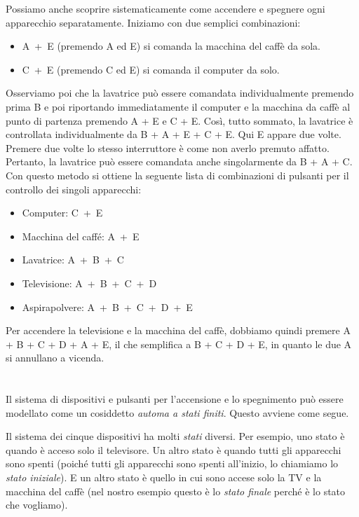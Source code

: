{{Possiamo anche scoprire sistematicamente come accendere e spegnere ogni apparecchio separatamente. Iniziamo con due semplici combinazioni:

\begin{itemize}
  \item A~+~E (premendo A ed E) si comanda la macchina del caffè da sola.
  \item C~+~E (premendo C ed E) si comanda il computer da solo.
\end{itemize}

Osserviamo poi che la lavatrice può essere comandata individualmente premendo prima B e poi riportando immediatamente il computer e la macchina da caffè al punto di partenza premendo A + E e C + E. Così, tutto sommato, la lavatrice è controllata individualmente da B + A + E + C + E. Qui E appare due volte. Premere due volte lo stesso interruttore è come non averlo premuto affatto. Pertanto, la lavatrice può essere comandata anche singolarmente da B + A + C. Con questo metodo si ottiene la seguente lista di combinazioni di pulsanti per il controllo dei singoli apparecchi:

\begin{itemize}
  \item Computer: C~+~E
  \item Macchina del caffé: A~+~E
  \item Lavatrice: A~+~B~+~C
  \item Televisione: A~+~B~+~C~+~D
  \item Aspirapolvere: A~+~B~+~C~+~D~+~E
\end{itemize}

Per accendere la televisione e la macchina del caffè, dobbiamo quindi premere A + B + C + D + A + E, il che semplifica a B + C + D + E, in quanto le due A si annullano a vicenda.



\section*{\BrochureItsInformatics}
Il sistema di dispositivi e pulsanti per l’accensione e lo spegnimento può essere modellato come un cosiddetto \emph{automa a stati finiti}. Questo avviene come segue.

Il sistema dei cinque dispositivi ha molti \emph{stati} diversi. Per esempio, uno stato è quando è acceso solo il televisore. Un altro stato è quando tutti gli apparecchi sono spenti (poiché tutti gli apparecchi sono spenti all’inizio, lo chiamiamo lo \emph{stato iniziale}). E un altro stato è quello in cui sono accese solo la TV e la macchina del caffè (nel nostro esempio questo è lo \emph{stato finale} perché è lo stato che vogliamo).

}}
